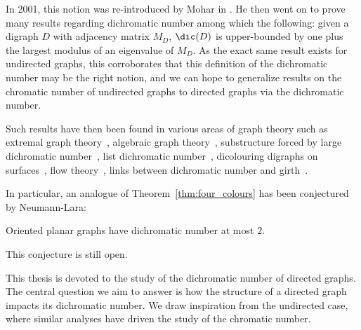 In 2001, this notion was re-introduced by Mohar in \cite{M03}. He then went on to prove many results regarding dichromatic number among which the following: given a digraph $D$ with adjacency matrix $M_D$, $\dic(D)$ is upper-bounded by one plus the largest modulus of an eigenvalue of $M_D$. As the exact same result exists for undirected graphs, this corroborates that this definition of the dichromatic number may be the right notion, and we can hope to generalize results on the chromatic number of undirected graphs to directed graphs via the dichromatic number.

Such results have then been found in various areas of graph theory such as extremal graph theory~\cite{BBSS20, HK15, KS20}, algebraic graph theory~\cite{M10}, substructure forced by large dichromatic number~\cite{AAC21, ACN21, ACL19, hero,GSS20, HLNT19, S21}, list dichromatic number~\cite{BHL18, HM11}, dicolouring digraphs on surfaces~\cite{AHKR21, LM17, S19}, flow theory~\cite{H17, KV12}, links between dichromatic number and girth~\cite{HM12, S20}.
\medskip

In particular, an analogue of Theorem~\ref{thm:four_colours} has been conjectured by Neumann-Lara:

\begin{conjecture}
Oriented planar graphs have dichromatic number at most $2$.
\end{conjecture}

This conjecture is still open.








\medskip

This thesis is devoted to the study of the dichromatic number of directed graphs. The central question we aim to answer is how the structure of a directed graph impacts its dichromatic number. We draw inspiration from the undirected case, where similar analyses have driven the study of the chromatic number.



